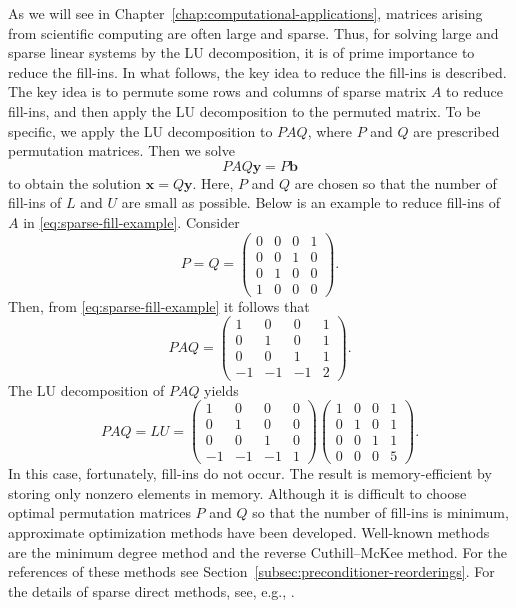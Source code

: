 {As we will see in Chapter~\ref{chap:computational-applications}, matrices arising from scientific computing are often large and sparse. Thus, for solving large and sparse linear systems by the LU decomposition, it is of prime importance to reduce the fill-ins. In what follows, the key idea to reduce the fill-ins is described.}
{The key idea is to permute some rows and columns of sparse matrix $A$ to reduce fill-ins, and then apply the LU decomposition to the permuted matrix. To be specific, we apply the LU decomposition to $PAQ$, where $P$ and $Q$ are prescribed permutation matrices. Then we solve}
\[PAQ\bm y=P\bm b\]
{to obtain the solution $\bm x=Q\bm y$. Here, $P$ and $Q$ are chosen so that the number of fill-ins of $L$ and $U$ are small as possible.}
{Below is an example to reduce fill-ins of $A$ in \eqref{eq:sparse-fill-example}. Consider}
\[
P=Q=\begin{pmatrix}0&0&0&1\\0&0&1&0\\0&1&0&0\\1&0&0&0\end{pmatrix}.
\]
{Then, from \eqref{eq:sparse-fill-example} it follows that}
\[
PAQ=\begin{pmatrix}1&0&0&1\\0&1&0&1\\0&0&1&1\\-1&-1&-1&2\end{pmatrix}.
\]
{The LU decomposition of $PAQ$ yields}
\[
PAQ=LU=\begin{pmatrix}1&0&0&0\\0&1&0&0\\0&0&1&0\\-1&-1&-1&1\end{pmatrix}
\begin{pmatrix}1&0&0&1\\0&1&0&1\\0&0&1&1\\0&0&0&5\end{pmatrix}.
\]
{In this case, fortunately, fill-ins do not occur. The result is memory-efficient by storing only nonzero elements in memory.}
{Although it is difficult to choose optimal permutation matrices $P$ and $Q$ so that the number of fill-ins is minimum, approximate optimization methods have been developed. Well-known methods are the minimum degree method and the reverse Cuthill--McKee method. For the references of these methods see Section~\ref{subsec:preconditioner-reorderings}. For the details of sparse direct methods, see, e.g., .}
